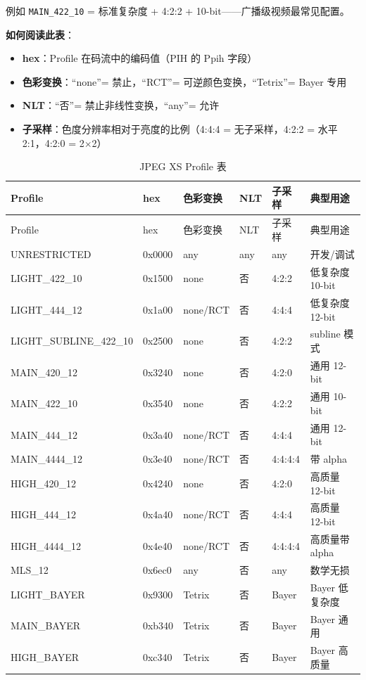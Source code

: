 例如 \texttt{MAIN\_422\_10} = 标准复杂度 + 4:2:2 + 10-bit——广播级视频最常见配置。

\medskip
\textbf{如何阅读此表}：
\begin{itemize}
  \item \textbf{hex}：Profile 在码流中的编码值（PIH 的 Ppih 字段）
  \item \textbf{色彩变换}：``none''= 禁止，``RCT''= 可逆颜色变换，``Tetrix''= Bayer 专用
  \item \textbf{NLT}：``否''= 禁止非线性变换，``any''= 允许
  \item \textbf{子采样}：色度分辨率相对于亮度的比例（4:4:4 = 无子采样，4:2:2 = 水平 2:1，4:2:0 = 2$\times$2）
\end{itemize}

\begin{longtable}{@{}llllll@{}}
\caption{JPEG XS Profile 表}
\label{tab:profile-table}\\
\toprule
Profile & hex & 色彩变换 & NLT & 子采样 & 典型用途 \\
\midrule
\endfirsthead
\toprule
Profile & hex & 色彩变换 & NLT & 子采样 & 典型用途 \\
\midrule
\endhead
UNRESTRICTED & 0x0000 & any & any & any & 开发/调试 \\
LIGHT\_422\_10 & 0x1500 & none & 否 & 4:2:2 & 低复杂度 10-bit \\
LIGHT\_444\_12 & 0x1a00 & none/RCT & 否 & 4:4:4 & 低复杂度 12-bit \\
LIGHT\_SUBLINE\_422\_10 & 0x2500 & none & 否 & 4:2:2 & subline 模式 \\
MAIN\_420\_12 & 0x3240 & none & 否 & 4:2:0 & 通用 12-bit \\
MAIN\_422\_10 & 0x3540 & none & 否 & 4:2:2 & 通用 10-bit \\
MAIN\_444\_12 & 0x3a40 & none/RCT & 否 & 4:4:4 & 通用 12-bit \\
MAIN\_4444\_12 & 0x3e40 & none/RCT & 否 & 4:4:4:4 & 带 alpha \\
HIGH\_420\_12 & 0x4240 & none & 否 & 4:2:0 & 高质量 12-bit \\
HIGH\_444\_12 & 0x4a40 & none/RCT & 否 & 4:4:4 & 高质量 12-bit \\
HIGH\_4444\_12 & 0x4e40 & none/RCT & 否 & 4:4:4:4 & 高质量带 alpha \\
MLS\_12 & 0x6ec0 & any & 否 & any & 数学无损 \\
LIGHT\_BAYER & 0x9300 & Tetrix & 否 & Bayer & Bayer 低复杂度 \\
MAIN\_BAYER & 0xb340 & Tetrix & 否 & Bayer & Bayer 通用 \\
HIGH\_BAYER & 0xc340 & Tetrix & 否 & Bayer & Bayer 高质量 \\
\bottomrule
\end{longtable}

